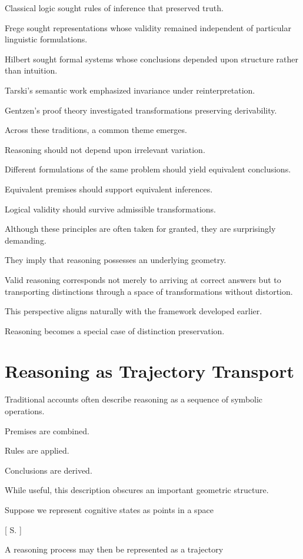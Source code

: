 \documentclass[11pt,oneside,openany]{book}
\begin{document}
Classical logic sought rules of inference that preserved truth.

Frege sought representations whose validity remained independent of particular linguistic formulations.

Hilbert sought formal systems whose conclusions depended upon structure rather than intuition.

Tarski's semantic work emphasized invariance under reinterpretation.

Gentzen's proof theory investigated transformations preserving derivability.

Across these traditions, a common theme emerges.

Reasoning should not depend upon irrelevant variation.

Different formulations of the same problem should yield equivalent conclusions.

Equivalent premises should support equivalent inferences.

Logical validity should survive admissible transformations.

Although these principles are often taken for granted, they are surprisingly demanding.

They imply that reasoning possesses an underlying geometry.

Valid reasoning corresponds not merely to arriving at correct answers but to transporting distinctions through a space of transformations without distortion.

This perspective aligns naturally with the framework developed earlier.

Reasoning becomes a special case of distinction preservation.

\section{Reasoning as Trajectory Transport}

Traditional accounts often describe reasoning as a sequence of symbolic operations.

Premises are combined.

Rules are applied.

Conclusions are derived.

While useful, this description obscures an important geometric structure.

Suppose we represent cognitive states as points in a space

[
\mathcal S.
]

A reasoning process may then be represented as a trajectory
\end{document}
